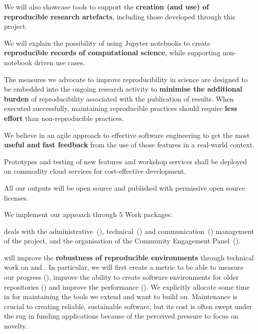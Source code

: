 \begin{compactenum}
  We will also showcase tools to support the \textbf{creation (and use) of reproducible
  research artefacts}, including those developed through this project.
\item We will explain the possibility of using Jupyter notebooks to create
  \textbf{reproducible records of computational science}, while supporting non-notebook
  driven use cases.
\item The measures we advocate to improve reproducibility in science are
  designed to be embedded into the ongoing research activity to \textbf{minimise the
  additional burden} of reproducibility associated with the publication of results.
  When executed successfully, maintaining reproducible practices should require
  \textbf{less effort} than non-reproducible practices.
\item We believe in an agile approach to effective software engineering to get
  the most \textbf{useful and fast feedback} from the use of those features in a real-world context.
\item Prototypes and testing of new features and workshop services shall be deployed on commodity cloud services
  for cost-effective development.
\item All our outputs will be open source and published with permissive
  open source licenses.
\end{compactenum}


\medskip
\noindent We implement our approach through 5 Work packages:

 deals with the administrative~(),
technical~() and
communication~() management of the
project, and the organisation of the Community Engagement
Panel~().

 will improve the \textbf{robustness of reproducible
environments} through technical work on \repotodocker{} and \binderhub{}. In
particular, we will first create a metric to be able to measure our progress
(), improve the ability to create
software environments for older repositories
() and improve the
performance (). We
explicitly allocate some time in  for
maintaining the tools we extend and want to build on. Maintenance is crucial
to creating reliable, sustainable software, but its cost is often swept
under the rug in funding applications because of the perceived pressure to
focus on novelty.

